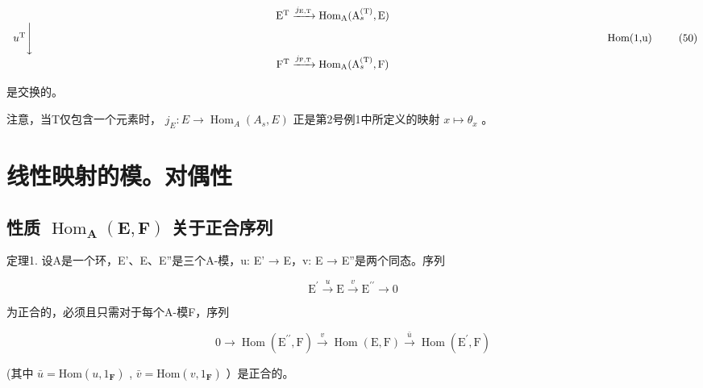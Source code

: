 \[
\begin{array}{c} \mathrm {E^ {T}} \xrightarrow {j _ {\mathrm{E,T}}} \operatorname{Hom} _ {\mathrm{A}} (\mathrm{A} _ {s} ^ {(\mathrm{T})}, \mathrm{E}) \\ u ^ {\mathrm{T}} \Biggl \downarrow \qquad \qquad \qquad \qquad \qquad \qquad \qquad \qquad \qquad \qquad \qquad \qquad \qquad \qquad \qquad \qquad \qquad \qquad \qquad \qquad \qquad \qquad \qquad \qquad \qquad \qquad \qquad \text {Hom(1,u)} \\ \mathrm {F^ {T}} \xrightarrow {j _ {\mathrm{F,T}}} \operatorname{Hom} _ {\mathrm{A}} (\mathrm{A} _ {s} ^ {(\mathrm{T})}, \mathrm{F}) \end{array}\tag{50}
\]

是交换的。

注意，当T仅包含一个元素时， \(j_{E}:E \to \operatorname{Hom}_{A}(A_{s}, E)\) 正是第2号例1中所定义的映射 \(x \mapsto \theta_{x}\) 。

\section{线性映射的模。对偶性}

\subsection{\texorpdfstring{性质 \(\operatorname{Hom}_{\mathbf{A}}(\mathbf{E}, \mathbf{F})\) 关于正合序列}{性质 \textbackslash operatorname\{Hom\}\_\{\textbackslash mathbf\{A\}\}(\textbackslash mathbf\{E\}, \textbackslash mathbf\{F\}关于正合序列的相对性}}

定理1. 设A是一个环，E'、E、E''是三个A-模，u: E' → E，v: E → E''是两个同态。序列

\[
\mathrm{E} ^ {\prime} \stackrel {u} {\longrightarrow} \mathrm{E} \stackrel {v} {\longrightarrow} \mathrm{E} ^ {\prime \prime} \longrightarrow 0\tag{1}
\]

为正合的，必须且只需对于每个A-模F，序列

\[
0 \longrightarrow \operatorname{Hom} (\mathrm{E} ^ {\prime \prime}, \mathrm{F}) \stackrel {v} {\longrightarrow} \operatorname{Hom} (\mathrm{E}, \mathrm{F}) \stackrel {\bar {u}} {\longrightarrow} \operatorname{Hom} (\mathrm{E} ^ {\prime}, \mathrm{F})\tag{2}
\]

(其中 \(\bar{u} = \mathrm{Hom}(u, 1_{\mathbf{F}})\) , \(\bar{v} = \mathrm{Hom}(v, 1_{\mathbf{F}})\) ）是正合的。

